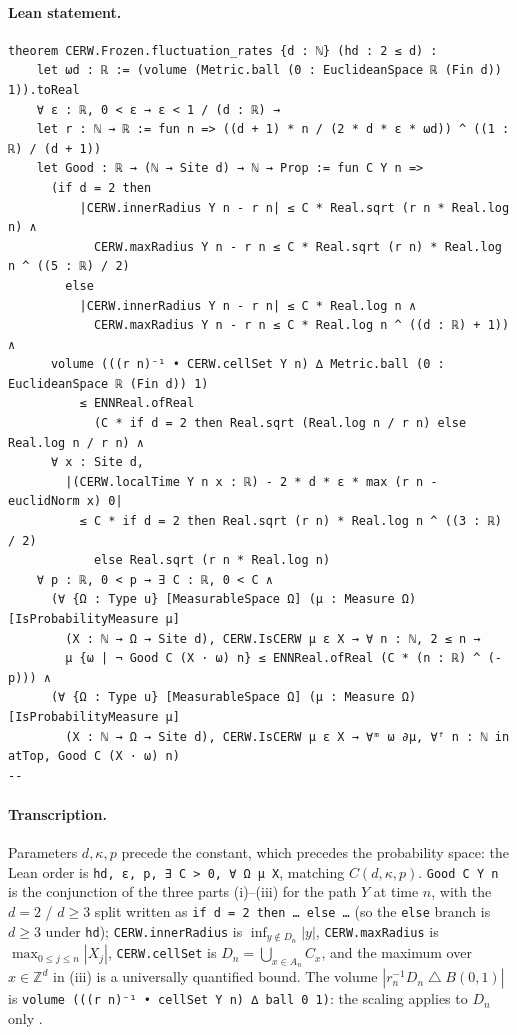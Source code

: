 \paragraph{Lean statement.}
\begin{verbatim}
theorem CERW.Frozen.fluctuation_rates {d : ℕ} (hd : 2 ≤ d) :
    let ωd : ℝ := (volume (Metric.ball (0 : EuclideanSpace ℝ (Fin d)) 1)).toReal
    ∀ ε : ℝ, 0 < ε → ε < 1 / (d : ℝ) →
    let r : ℕ → ℝ := fun n => ((d + 1) * n / (2 * d * ε * ωd)) ^ ((1 : ℝ) / (d + 1))
    let Good : ℝ → (ℕ → Site d) → ℕ → Prop := fun C Y n =>
      (if d = 2 then
          |CERW.innerRadius Y n - r n| ≤ C * Real.sqrt (r n * Real.log n) ∧
            CERW.maxRadius Y n - r n ≤ C * Real.sqrt (r n) * Real.log n ^ ((5 : ℝ) / 2)
        else
          |CERW.innerRadius Y n - r n| ≤ C * Real.log n ∧
            CERW.maxRadius Y n - r n ≤ C * Real.log n ^ ((d : ℝ) + 1)) ∧
      volume (((r n)⁻¹ • CERW.cellSet Y n) ∆ Metric.ball (0 : EuclideanSpace ℝ (Fin d)) 1)
          ≤ ENNReal.ofReal
            (C * if d = 2 then Real.sqrt (Real.log n / r n) else Real.log n / r n) ∧
      ∀ x : Site d,
        |(CERW.localTime Y n x : ℝ) - 2 * d * ε * max (r n - euclidNorm x) 0|
          ≤ C * if d = 2 then Real.sqrt (r n) * Real.log n ^ ((3 : ℝ) / 2)
            else Real.sqrt (r n * Real.log n)
    ∀ p : ℝ, 0 < p → ∃ C : ℝ, 0 < C ∧
      (∀ {Ω : Type u} [MeasurableSpace Ω] (μ : Measure Ω) [IsProbabilityMeasure μ]
        (X : ℕ → Ω → Site d), CERW.IsCERW μ ε X → ∀ n : ℕ, 2 ≤ n →
        μ {ω | ¬ Good C (X · ω) n} ≤ ENNReal.ofReal (C * (n : ℝ) ^ (-p))) ∧
      (∀ {Ω : Type u} [MeasurableSpace Ω] (μ : Measure Ω) [IsProbabilityMeasure μ]
        (X : ℕ → Ω → Site d), CERW.IsCERW μ ε X → ∀ᵐ ω ∂μ, ∀ᶠ n : ℕ in atTop, Good C (X · ω) n)
--
\end{verbatim}
\paragraph{Transcription.}
Parameters $d,\kappa,p$ precede the constant, which precedes the probability space: the Lean order is \texttt{hd, ε, p, ∃ C > 0, ∀ Ω μ X}, matching $C(d,\kappa,p)$. \texttt{Good C Y n} is the conjunction of the three parts (i)--(iii) for the path $Y$ at time $n$, with the $d=2$ / $d\ge3$ split written as \texttt{if d = 2 then … else …} (so the \texttt{else} branch is $d\ge3$ under \texttt{hd}); \texttt{CERW.innerRadius} is $\inf_{y\notin D_n}|y|$, \texttt{CERW.maxRadius} is $\max_{0\le j\le n}|X_j|$, \texttt{CERW.cellSet} is $D_n=\bigcup_{x\in A_n}C_x$, and the maximum over $x\in\mathbb Z^d$ in (iii) is a universally quantified bound. The volume $|r_n^{-1}D_n\mathbin\triangle B(0,1)|$ is \texttt{volume (((r n)⁻¹ • cellSet Y n) ∆ ball 0 1)}: the scaling applies to $D_n$ only .
